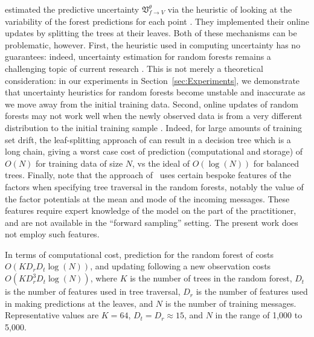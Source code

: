 \documentclass[english]{article}
\theoremstyle{plain}
\theoremstyle{plain}
\newcommand{\factor}{f}				%
\newcommand{\outV}{V}                         %
\newcommand{\uncertaintyMsg}[3]{{\mathfrak V}_{#1 \rightarrow #2}^{#3}}			%
\newcommand{\wjnote}[1]{ }
\newcommand{\secref}[1]{Section~\ref{#1}}
\begin{document}
\cite{Eslami2014} estimated the predictive uncertainty  $\uncertaintyMsg{\factor}{\outV}{\theta}$  via
the heuristic of looking at the variability of the forest predictions for each point \citep{CriSho13}.
They implemented their online updates by splitting the trees at their
leaves.
Both of these mechanisms can be problematic, however. First, the heuristic
used in computing uncertainty has no guarantees: indeed, uncertainty estimation for
random forests remains a challenging topic of current research \citep{Hutter2009}. This is not merely a theoretical
consideration: in our experiments in \secref{sec:Experiments}, we demonstrate that 
uncertainty heuristics for random forests become unstable and inaccurate as we move away from the initial
training data. Second, online updates of random forests may not work well
when the newly observed data is from a very different distribution to the
initial training sample \citep[e.g.][Fig. 3]{LakRoyTeh14}. 
Indeed, for large amounts of training set drift, the
leaf-splitting approach of \citeauthor{Eslami2014} can result in a decision tree which is a long chain, giving a worst case
cost of prediction (computational and storage) of $O(N)$ for training data of size $N$, vs the ideal of $O(\log(N))$
for balanced trees.
Finally, note that the approach of \citeauthor{Eslami2014}\ uses certain bespoke features of the factors when
specifying tree traversal in the random forests,
notably the value of the factor potentials at the mean and mode of the incoming messages.
These features 
require expert knowledge of the model on the part
of the practitioner, and are not available in the ``forward sampling'' setting. The present
work does not employ such features.


In terms of computational cost, prediction for the random forest of \citeauthor{Eslami2014} costs $O(K D_r D_t \log(N))$,
and updating following a new observation costs  $O(K D_r^3 D_t \log(N))$,
where $K$ is the number of trees in the random forest, $D_t$
is the number of features used in tree traversal, $D_r$ is the number of features used in making predictions
at the leaves, and $N$ is the number of training messages.
Representative values are $K=64$, $D_t=D_r\approx 15$, and $N$ in the range of  1,000 to 5,000.
\end{document}
